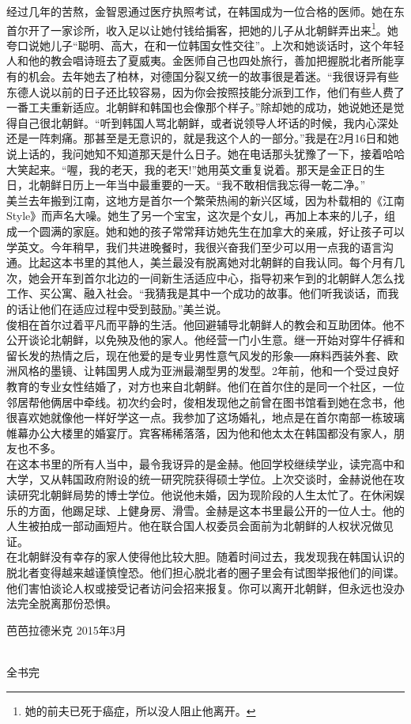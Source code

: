 经过几年的苦熬，金智恩通过医疗执照考试，在韩国成为一位合格的医师。她在东首尔开了一家诊所，收入足以让她付钱给掮客，把她的儿子从北朝鲜弄出来\footnote{她的前夫已死于癌症，所以没人阻止他离开。}。她夸口说她儿子“聪明、高大，在和一位韩国女性交往”。上次和她谈话时，这个年轻人和他的教会唱诗班去了夏威夷。金医师自己也四处旅行，善加把握脱北者所能享有的机会。去年她去了柏林，对德国分裂又统一的故事很是着迷。“我很讶异有些东德人说以前的日子还比较容易，因为你会按照技能分派到工作，他们有些人费了一番工夫重新适应。北朝鲜和韩国也会像那个样子。”除却她的成功，她说她还是觉得自己很北朝鲜。“听到韩国人骂北朝鲜，或者说领导人坏话的时候，我内心深处还是一阵刺痛。那甚至是无意识的，就是我这个人的一部分。”我是在2月16日和她说上话的，我问她知不知道那天是什么日子。她在电话那头犹豫了一下，接着哈哈大笑起来。“喔，我的老天，我的老天!”她用英文重复说着。那天是金正日的生日，北朝鲜日历上一年当中最重要的一天。“我不敢相信我忘得一乾二净。”\\

美兰去年搬到江南，这地方是首尔一个繁荣热闹的新兴区域，因为朴载相的《江南Style》而声名大噪。她生了另一个宝宝，这次是个女儿，再加上本来的儿子，组成一个圆满的家庭。她和她的孩子常常拜访她先生在加拿大的亲戚，好让孩子可以学英文。今年稍早，我们共进晚餐时，我很兴奋我们至少可以用一点我的语言沟通。比起这本书里的其他人，美兰最没有脱离她对北朝鲜的自我认同。每个月有几次，她会开车到首尔北边的一间新生活适应中心，指导初来乍到的北朝鲜人怎么找工作、买公寓、融入社会。“我猜我是其中一个成功的故事。他们听我谈话，而我的话让他们在适应过程中受到鼓励。”美兰说。\\

俊相在首尔过着平凡而平静的生活。他回避辅导北朝鲜人的教会和互助团体。他不公开谈论北朝鲜，以免殃及他的家人。他经营一门小生意。继一开始对穿牛仔裤和留长发的热情之后，现在他爱的是专业男性意气风发的形象──麻料西装外套、欧洲风格的墨镜、让韩国男人成为亚洲最潮型男的发型。2年前，他和一个受过良好教育的专业女性结婚了，对方也来自北朝鲜。他们在首尔住的是同一个社区，一位邻居帮他俩居中牵线。初次约会时，俊相发现他之前曾在图书馆看到她在念书，他很喜欢她就像他一样好学这一点。我参加了这场婚礼，地点是在首尔南部一栋玻璃帷幕办公大楼里的婚宴厅。宾客稀稀落落，因为他和他太太在韩国都没有家人，朋友也不多。\\

在这本书里的所有人当中，最令我讶异的是金赫。他回学校继续学业，读完高中和大学，又从韩国政府附设的统一研究院获得硕士学位。上次交谈时，金赫说他在攻读研究北朝鲜局势的博士学位。他说他未婚，因为现阶段的人生太忙了。在休闲娱乐的方面，他踢足球、上健身房、滑雪。金赫是这本书里最公开的一位人士。他的人生被拍成一部动画短片。他在联合国人权委员会面前为北朝鲜的人权状况做见证。\\

在北朝鲜没有幸存的家人使得他比较大胆。随着时间过去，我发现我在韩国认识的脱北者变得越来越谨慎惶恐。他们担心脱北者的圈子里会有试图举报他们的间谍。他们害怕谈论人权或接受记者访问会招来报复。你可以离开北朝鲜，但永远也没办法完全脱离那份恐惧。\\

\begin{flushright}
	芭芭拉德米克 2015年3月
\end{flushright}


\begin{center}
	{\FA } \\
	全书完
\end{center}
